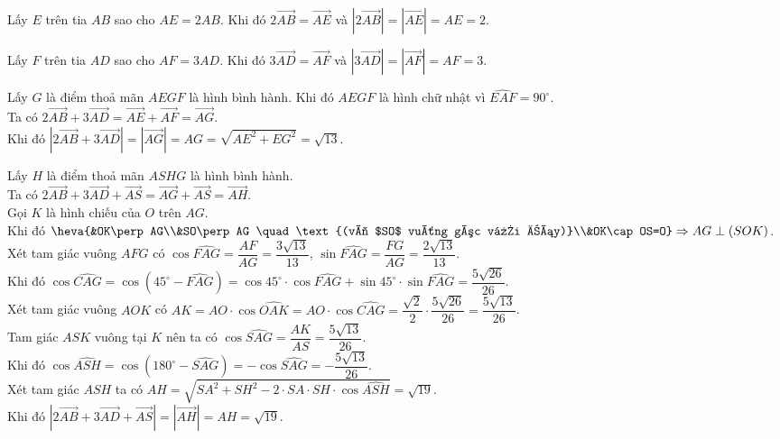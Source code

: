 \begin{bt}
{\begin{listEX}[1]
    \item Lấy $E$ trên tia $AB$ sao cho $AE=2AB$. Khi đó $2\overrightarrow{AB}=\overrightarrow{AE}$ và $\left|2\overrightarrow{AB}\right|=\left|\overrightarrow{AE}\right|=AE=2$.
    \item Lấy $F$ trên tia $AD$ sao cho $AF=3AD$. Khi đó $3\overrightarrow{AD}=\overrightarrow{AF}$ và $\left|3\overrightarrow{AD}\right|=\left|\overrightarrow{AF}\right|=AF=3$.
    \item Lấy $G$ là điểm thoả mãn $AEGF$ là hình bình hành. Khi đó $AEGF$ là hình chữ nhật vì $\widehat{EAF}=90^\circ$.\\
    Ta có $2\overrightarrow{AB}+3\overrightarrow{AD}=\overrightarrow{AE}+\overrightarrow{AF}=\overrightarrow{AG}$.\\
    Khi đó $\left|2\overrightarrow{AB}+3\overrightarrow{AD}\right|=\left|\overrightarrow{AG}\right|=AG=\sqrt{AE^2+EG^2}=\sqrt{13}$.
    \item Lấy $H$ là điểm thoả mãn $ASHG$ là hình bình hành. \\
    Ta có $2\overrightarrow{AB}+3\overrightarrow{AD}+\overrightarrow{AS}=\overrightarrow{AG}+\overrightarrow{AS}=\overrightarrow{AH}$.\\
    Gọi $K$ là hình chiếu của $O$ trên $AG$.\\
    Khi đó $\heva{&OK\perp AG\\&SO\perp AG \quad \text{(vì $SO$ vuông góc với đáy)}\\&OK\cap OS=O}\Rightarrow AG\perp (SOK)$.\\
    Xét tam giác vuông $AFG$ có $\cos \widehat{FAG}=\dfrac{AF}{AG}=\dfrac{3\sqrt{13}}{13}$, $\sin \widehat{FAG}=\dfrac{FG}{AG}=\dfrac{2\sqrt{13}}{13}$. \\
    Khi đó $\cos \widehat{CAG} = \cos \left(45^\circ - \widehat{FAG}\right) = \cos 45^\circ\cdot\cos \widehat{FAG}+ \sin 45^\circ\cdot\sin \widehat{FAG}=\dfrac{5\sqrt{26}}{26}$.\\
    Xét tam giác vuông $AOK$ có $AK=AO\cdot \cos \widehat{OAK}=AO\cdot \cos \widehat{CAG}=\dfrac{\sqrt{2}}{2}\cdot \dfrac{5\sqrt{26}}{26}=\dfrac{5\sqrt{13}}{26}$. \\
    Tam giác $ASK$ vuông tại $K$ nên ta có $\cos \widehat{SAG}=\dfrac{AK}{AS}=\dfrac{5\sqrt{13}}{26}$.\\
    Khi đó $\cos \widehat{ASH}=\cos \left(180^\circ-\widehat{SAG}\right)=-\cos \widehat{SAG}=-\dfrac{5\sqrt{13}}{26}$.\\
    Xét tam giác $ASH$ ta có $AH=\sqrt{SA^2+SH^2-2\cdot SA \cdot SH\cdot \cos \widehat{ASH}}=\sqrt{19}$.\\
    Khi đó $\left|2\overrightarrow{AB}+3\overrightarrow{AD}+\overrightarrow{AS}\right|=\left|\overrightarrow{AH}\right|=AH=\sqrt{19}$.
\end{listEX}}
\end{bt}

